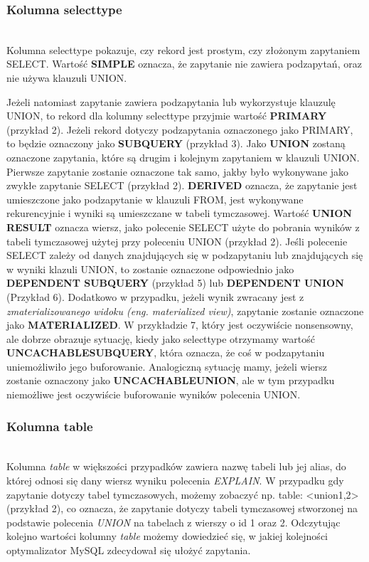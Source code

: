 \subsubsection{Kolumna select\textunderscore type}\leavevmode\\
Kolumna select\textunderscore type pokazuje, czy rekord jest prostym, czy złożonym zapytaniem SELECT. 
Wartość \textbf{SIMPLE} oznacza, że zapytanie nie zawiera podzapytań, oraz nie używa klauzuli UNION.

Jeżeli natomiast zapytanie zawiera podzapytania lub wykorzystuje klauzulę UNION, to rekord dla kolumny select\textunderscore type przyjmie wartość \textbf{PRIMARY} (przykład 2). Jeżeli rekord dotyczy podzapytania oznaczonego jako PRIMARY, to będzie oznaczony jako \textbf{SUBQUERY} (przykład 3). Jako \textbf{UNION} zostaną oznaczone zapytania, które są drugim i kolejnym zapytaniem w klauzuli UNION. Pierwsze zapytanie zostanie oznaczone tak samo, jakby było wykonywane jako zwykłe zapytanie SELECT (przykład 2). \textbf{DERIVED} oznacza, że zapytanie jest umieszczone jako podzapytanie w klauzuli FROM, jest wykonywane rekurencyjnie i wyniki są umieszczane w tabeli tymczasowej. Wartość \textbf{UNION RESULT} oznacza wiersz, jako polecenie SELECT użyte do pobrania wyników z tabeli tymczasowej użytej przy poleceniu UNION (przykład 2). Jeśli polecenie SELECT zależy od danych znajdujących się w podzapytaniu lub znajdujących się w wyniki klazuli UNION, to zostanie oznaczone odpowiednio jako \textbf{DEPENDENT SUBQUERY} (przykład 5) lub \textbf{DEPENDENT UNION} (Przykład 6). Dodatkowo w przypadku, jeżeli wynik zwracany jest z \textit{zmaterializowanego widoku (eng. materialized view)}, zapytanie zostanie oznaczone jako \textbf{MATERIALIZED}. W przykładzie 7, który jest oczywiście nonsensowny, ale dobrze obrazuje sytuację, kiedy jako select\textunderscore type otrzymamy wartość \textbf{UNCACHABLE\textunderscore SUBQUERY}, która oznacza, że coś w podzapytaniu uniemożliwiło jego buforowanie. Analogiczną sytuację mamy, jeżeli wiersz zostanie oznaczony jako \textbf{UNCACHABLE\textunderscore UNION}, ale w tym przypadku niemożliwe jest oczywiście buforowanie wyników polecenia UNION.

\subsubsection{Kolumna table}\leavevmode\\
Kolumna \textit{table} w większości przypadków zawiera nazwę tabeli lub jej alias, do której odnosi się dany wiersz wyniku polecenia \textit{EXPLAIN}. W przypadku gdy zapytanie dotyczy tabel tymczasowych, możemy zobaczyć np. table: <union1,2> (przykład 2), co oznacza, że zapytanie dotyczy tabeli tymczasowej stworzonej na podstawie polecenia \textit{UNION} na tabelach z wierszy o id 1 oraz 2.
Odczytując kolejno wartości kolumny \textit{table} możemy dowiedzieć się, w jakiej kolejności optymalizator MySQL zdecydował się ułożyć zapytania. 

